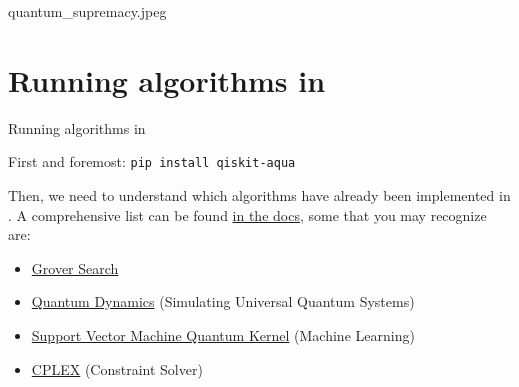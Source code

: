 \documentclass[aspectratio=43]{beamer}
\begin{document}
\begin{frameImg}[height]{quantum_supremacy.jpeg}

\end{frameImg}


\section{Running algorithms in \qka}
\begin{frame}{Running algorithms in \qka}
    \begin{card}
        First and foremost: \texttt{pip install qiskit-aqua}
    \end{card}
    \begin{cardTiny}
        Then, we need to understand which algorithms have already been implemented in \qka. A comprehensive list can be found \href{https://qiskit.org/documentation/aqua/algorithms.html}{in the docs}, some that you may recognize are:
        \begin{itemize}
            \item \href{https://qiskit.org/documentation/aqua/algorithms.html#quantum-grover-search}{Grover Search}
            \item \href{https://qiskit.org/documentation/aqua/algorithms.html#quantum-dynamics}{Quantum Dynamics} (Simulating Universal Quantum Systems)
            \item \href{https://qiskit.org/documentation/aqua/algorithms.html#support-vector-machine-quantum-kernel-svm-q-kernel}{Support Vector Machine Quantum Kernel} (Machine Learning)
            \item \href{https://qiskit.org/documentation/aqua/algorithms.html#cplex}{CPLEX} (Constraint Solver)
        \end{itemize}
    \end{cardTiny}
\pagenumber
\end{frame}
\end{document}
